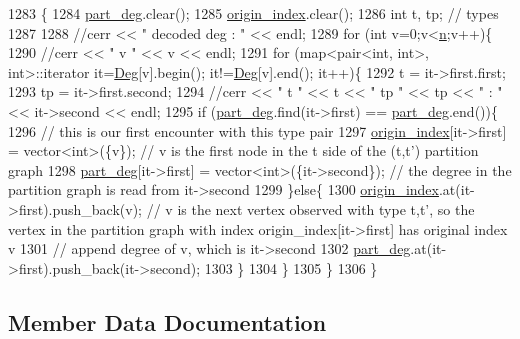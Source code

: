 \begin{DoxyCode}
1283 \{
1284   \hyperlink{classmarked__graph__decoder_a6882e96fcad9abb10e72f1398814824a}{part\_deg}.clear();
1285   \hyperlink{classmarked__graph__decoder_aab3e2f6d4376ba96da32f25aa9ddd069}{origin\_index}.clear();
1286   \textcolor{keywordtype}{int} t, tp; \textcolor{comment}{// types}
1287 
1288   \textcolor{comment}{//cerr << " decoded deg : " << endl;}
1289   \textcolor{keywordflow}{for} (\textcolor{keywordtype}{int} v=0;v<\hyperlink{classmarked__graph__decoder_aefc93611bc4a3e9a5d3956d97649a0e9}{n};v++)\{
1290     \textcolor{comment}{//cerr << " v " << v << endl;}
1291     \textcolor{keywordflow}{for} (map<pair<int, int>, \textcolor{keywordtype}{int}>::iterator it=\hyperlink{classmarked__graph__decoder_a5040ad86467693eab415f615408bfb9e}{Deg}[v].begin(); it!=\hyperlink{classmarked__graph__decoder_a5040ad86467693eab415f615408bfb9e}{Deg}[v].end(); it++)\{
1292       t = it->first.first;
1293       tp = it->first.second;
1294       \textcolor{comment}{//cerr << " t " << t << " tp " << tp << " : " << it->second << endl;}
1295       \textcolor{keywordflow}{if} (\hyperlink{classmarked__graph__decoder_a6882e96fcad9abb10e72f1398814824a}{part\_deg}.find(it->first) == \hyperlink{classmarked__graph__decoder_a6882e96fcad9abb10e72f1398814824a}{part\_deg}.end())\{
1296         \textcolor{comment}{// this is our first encounter with this type pair}
1297         \hyperlink{classmarked__graph__decoder_aab3e2f6d4376ba96da32f25aa9ddd069}{origin\_index}[it->first] = vector<int>(\{v\}); \textcolor{comment}{// v is the first node in the t side of the
       (t,t') partition graph}
1298         \hyperlink{classmarked__graph__decoder_a6882e96fcad9abb10e72f1398814824a}{part\_deg}[it->first] = vector<int>(\{it->second\}); \textcolor{comment}{// the degree in the partition graph is
       read from it->second}
1299       \}\textcolor{keywordflow}{else}\{
1300         \hyperlink{classmarked__graph__decoder_aab3e2f6d4376ba96da32f25aa9ddd069}{origin\_index}.at(it->first).push\_back(v); \textcolor{comment}{// v is the next vertex observed with type
       t,t', so the vertex in the partition graph with index origin\_index[it->first] has original index v }
1301         \textcolor{comment}{// append degree of v, which is it->second}
1302         \hyperlink{classmarked__graph__decoder_a6882e96fcad9abb10e72f1398814824a}{part\_deg}.at(it->first).push\_back(it->second);
1303       \}
1304     \}
1305   \}
1306 \}
\end{DoxyCode}


\subsection{Member Data Documentation}
\mbox{\label{classmarked__graph__decoder_a5040ad86467693eab415f615408bfb9e}} 
